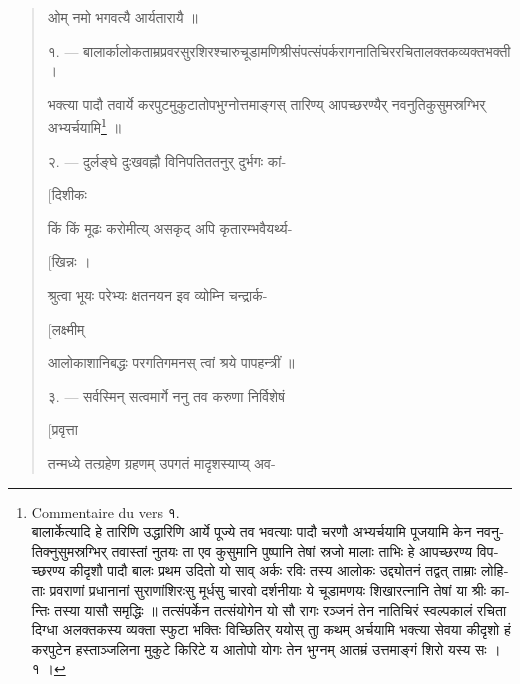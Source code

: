 \documentclass[a4paper, 11pt, oneside, french, landscape, twocolumn]{article}
\begin{document}
\bigskip
\begin{quotation}\scriptsize
\texthindi{ओम् नमो भगवत्यै आर्यतारायै ॥}

\bigskip

\texthindi{१}. --- \texthindi{बालार्कालोकताम्रप्रवरसुरशिरश्चारुचूडामणिश्रीसंपत्संपर्करागनातिचिररचितालक्तकव्यक्तभक्ती ।}

\texthindi{भक्त्या पादौ तवार्ये करपुटमुकुटातोपभुग्नोत्तमाङ्गस् तारिण्य् आपच्छरण्यैर् नवनुतिकुसुमस्रग्भिर् अभ्यर्चयामि\footnote{Commentaire du vers \texthindi{१}.\\\hspace*{5mm}\texthindi{बालार्केत्यादि हे तारिणि उद्धारिणि आर्ये पूज्ये तव भवत्याः पादौ चरणौ अभ्यर्चयामि पूजयामि केन नवनुतिक्नुसुमस्रग्भिर् तवास्तां नुतयः ता एव कुसुमानि पुष्पानि तेषां स्रजो मालाः ताभिः हे आपच्छरण्य विपच्छरण्य कीदृशौ पादौ बालः प्रथम उदितो यो साव् अर्कः रविः तस्य आलोकः उद्द्योतनं तद्वत् ताम्राः लोहिताः प्रवराणां प्रधानानां सुराणांशिरःसु मूर्धसु चारवो दर्शनीयाः ये चूडामणयः शिखारत्नानि तेषां या श्रीः कान्तिः तस्या यासौ समृद्धिः ॥ तत्संपर्केन तत्संयोगेन यो सौ रागः रञ्जनं तेन नातिचिरं स्वल्पकालं रचिता दिग्धा अलक्तकस्य व्यक्ता स्फुटा भक्तिः विच्छितिर् ययोस् ताु कथम् अर्चयामि भक्त्या सेवया कीदृशो हं करपुटेन हस्ताञ्जलिना मुकुटे किरिटे य आतोपो योगः तेन भुग्नम् आतम्रं उत्तमाङ्गं शिरो यस्य सः । १ ।}} ॥}

\bigskip

\texthindi{२}. --- \texthindi{दुर्लङ्घे दुःखवह्नौ विनिपतिततनुर् दुर्भगः कां-}

\hspace*{55mm}\texthindi{[दिशीकः}

\texthindi{किं किं मूढः करोमीत्य् असकृद् अपि कृतारम्भवैयर्थ्य-}

\hspace*{55mm}\texthindi{[खिन्नः ।}

\texthindi{श्रुत्वा भूयः परेभ्यः क्षतनयन इव व्योम्नि चन्द्रार्क-}

\hspace*{55mm}\texthindi{[लक्ष्मीम्}

\texthindi{आलोकाशानिबद्धः परगतिगमनस् त्वां श्रये पापहन्त्रीं ॥}

\bigskip

\texthindi{३}. --- \texthindi{सर्वस्मिन् सत्वमार्गे ननु तव करुणा निर्विशेषं}

\hspace*{55mm}\texthindi{[प्रवृत्ता}

\texthindi{तन्मध्ये तत्ग्रहेण ग्रहणम् उपगतं मादृशस्याप्य् अव-}


\end{quotation}
\end{document}
